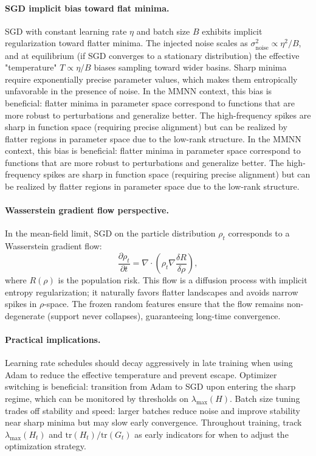 \documentclass{article}
\begin{document}
\paragraph{SGD implicit bias toward flat minima.}
SGD with constant learning rate \( \eta \) and batch size \( B \) exhibits implicit regularization toward flatter minima. The injected noise scales as \( \sigma_{\text{noise}}^2 \propto \eta^2/B \), and at equilibrium (if SGD converges to a stationary distribution) the effective "temperature" \( T \propto \eta/B \) biases sampling toward wider basins. Sharp minima require exponentially precise parameter values, which makes them entropically unfavorable in the presence of noise. In the MMNN context, this bias is beneficial: flatter minima in parameter space correspond to functions that are more robust to perturbations and generalize better. The high-frequency spikes are sharp in function space (requiring precise alignment) but can be realized by flatter regions in parameter space due to the low-rank structure.
In the MMNN context, this bias is beneficial: flatter minima in parameter space correspond to functions that are more robust to perturbations and generalize better. The high-frequency spikes are sharp in function space (requiring precise alignment) but can be realized by flatter regions in parameter space due to the low-rank structure.

\paragraph{Wasserstein gradient flow perspective.}
In the mean-field limit, SGD on the particle distribution \( \rho_t \) corresponds to a Wasserstein gradient flow:
\[
\frac{\partial \rho_t}{\partial t} = \nabla \cdot (\rho_t \nabla \frac{\delta R}{\delta \rho}),
\]
where \( R(\rho) \) is the population risk. This flow is a diffusion process with implicit entropy regularization; it naturally favors flatter landscapes and avoids narrow spikes in \( \rho \)-space. The frozen random features ensure that the flow remains non-degenerate (support never collapses), guaranteeing long-time convergence.

\paragraph{Practical implications.}
Learning rate schedules should decay aggressively in late training when using Adam to reduce the effective temperature and prevent escape. Optimizer switching is beneficial: transition from Adam to SGD upon entering the sharp regime, which can be monitored by thresholds on \( \lambda_{\max}(H) \). Batch size tuning trades off stability and speed: larger batches reduce noise and improve stability near sharp minima but may slow early convergence. Throughout training, track \( \lambda_{\max}(H_t) \) and \( \text{tr}(H_t)/\text{tr}(G_t) \) as early indicators for when to adjust the optimization strategy.
\end{document}
